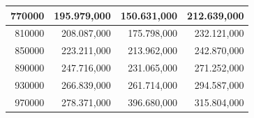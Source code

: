 \documentclass[a4paper, 12pt]{article}
\begin{document}
\begin{longtable}[c]{@{}rrrr@{}}
	\multicolumn{1}{|r|}{770000}                  & \multicolumn{1}{r|}{195.979,000}       & \multicolumn{1}{r|}{150.631,000}         & \multicolumn{1}{r|}{212.639,000}       \\* \midrule
	\multicolumn{1}{|r|}{810000}                  & \multicolumn{1}{r|}{208.087,000}       & \multicolumn{1}{r|}{175.798,000}         & \multicolumn{1}{r|}{232.121,000}       \\* \midrule
	\multicolumn{1}{|r|}{850000}                  & \multicolumn{1}{r|}{223.211,000}       & \multicolumn{1}{r|}{213.962,000}         & \multicolumn{1}{r|}{242.870,000}       \\* \midrule
	\multicolumn{1}{|r|}{890000}                  & \multicolumn{1}{r|}{247.716,000}       & \multicolumn{1}{r|}{231.065,000}         & \multicolumn{1}{r|}{271.252,000}       \\* \midrule
	\multicolumn{1}{|r|}{930000}                  & \multicolumn{1}{r|}{266.839,000}       & \multicolumn{1}{r|}{261.714,000}         & \multicolumn{1}{r|}{294.587,000}       \\* \midrule
	\multicolumn{1}{|r|}{970000}                  & \multicolumn{1}{r|}{278.371,000}       & \multicolumn{1}{r|}{396.680,000}         & \multicolumn{1}{r|}{315.804,000}       \\* \bottomrule
\end{longtable}
\end{document}
